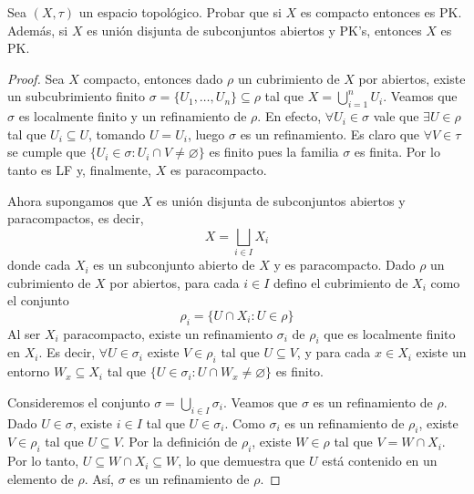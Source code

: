 \documentclass{article}
\theoremstyle{plain}
\theoremstyle{definition}
\newenvironment{ejercicio}[1]{\begin{trivlist}
\item[\hskip \labelsep {\bfseries Ejercicio}\hskip \labelsep {\bfseries #1.}]}{\end{trivlist}}
\begin{document}
\begin{ejercicio}{3}
    Sea \( (X, \tau) \) un espacio topológico. Probar que si \( X \) es compacto entonces es PK. Además, si \( X \) es unión disjunta de subconjuntos abiertos y PK's, entonces \( X \) es PK.
\end{ejercicio}
\begin{proof}
    Sea \( X \) compacto, entonces dado \( \rho \) un cubrimiento de \( X \) por abiertos, existe un subcubrimiento
    finito \( \sigma = \{ U_1, \ldots, U_n \} \subseteq \rho \) tal que \( X = \bigcup_{i = 1}^n U_i \).
    Veamos que \( \sigma \) es localmente finito y un refinamiento de \( \rho \). En efecto, \( \forall U_i \in \sigma \) vale que \( \exists U \in \rho \) tal que \( U_i \subseteq U \), tomando \( U = U_i \), luego \( \sigma \) es un refinamiento.
    Es claro que \( \forall V \in \tau \) se cumple que \( \{ U_i \in \sigma : U_i \cap V \neq \varnothing \} \) es finito pues la familia \( \sigma \) es finita. Por lo tanto es LF y, finalmente, \( X \) es paracompacto.

    Ahora supongamos que \( X \) es unión disjunta de subconjuntos abiertos y paracompactos, es decir, \[
        X = \bigsqcup_{i \in I} X_i
    \]
    donde cada \( X_i \) es un subconjunto abierto de \( X \) y es paracompacto.
    Dado \( \rho \) un cubrimiento de \( X \) por abiertos, para cada \( i \in I \) defino el cubrimiento de \( X_i \) como el conjunto \[
        \rho_i = \{ U \cap X_i : U \in \rho \}
    \]
    Al ser \( X_i \) paracompacto, existe un refinamiento \( \sigma_i \) de \( \rho_i \) que es localmente finito en \( X_i \). Es decir,
    \( \forall U \in \sigma_i \) existe \( V \in \rho_i \) tal que \( U \subseteq V \), y para cada \( x \in X_i \) existe un entorno \( W_x \subseteq X_i \) tal que \( \{ U \in \sigma_i : U \cap W_x \neq \varnothing \} \) es finito.

    Consideremos el conjunto \( \sigma = \bigcup_{i \in I} \sigma_i \). Veamos que \( \sigma \) es un refinamiento de \( \rho \). Dado \( U \in \sigma \), existe \( i \in I \)
    tal que \( U \in \sigma_i \). Como \( \sigma_i \) es un refinamiento de \( \rho_i \), existe \( V \in \rho_i \) tal que \( U \subseteq V \). Por la definición de \( \rho_i \), existe \( W \in \rho \) tal que \( V = W \cap X_i \). Por lo tanto, \( U \subseteq W \cap X_i \subseteq W \), lo que demuestra que \( U \) está contenido en un elemento de \( \rho \). Así, \( \sigma \) es un refinamiento de \( \rho \).


\end{proof}
\end{document}

